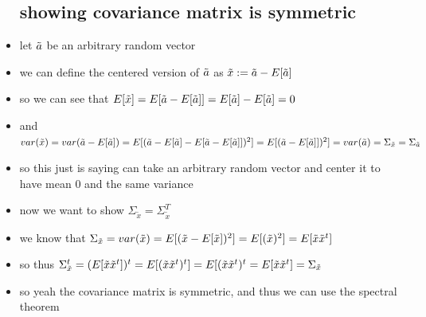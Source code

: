 \documentclass{article}
\begin{document}
\begin{itemize}
\subsection*{showing covariance matrix is symmetric}
\item let $\Tilde{a}$ be an arbitrary random vector
\item we can define  the centered version of $\Tilde{a}$ as $\Tilde{x}:=\Tilde{a}-E[\Tilde{a}]$ 
\item so we can see that $E[\Tilde{x}]=E[\Tilde{a}-E[\Tilde{a}]]=E[\Tilde{a}]-E[\Tilde{a}]=0$
\item and $var(\Tilde{x})=var(\Tilde{a}-E[\Tilde{a}])=E[(\Tilde{a}-E[\Tilde{a}] - E[\Tilde{a}-E[\Tilde{a}]])^2]=E[(\Tilde{a}-E[\Tilde{a}]])^2]=var(\Tilde{a})=\Sigma_{\Tilde{x}}=\Sigma_{\tilde{a}}$
\item so this just is saying can take an arbitrary random vector and center it to have mean 0 and the same variance
\item now we want to show $\Sigma_{\tilde{x}}=\Sigma_{\tilde{x}}^{T}$
\item we know that $\Sigma_{\Tilde{x}}=var(\Tilde{x})=E[(\Tilde{x}-E[\Tilde{x}])^2]=E[(\Tilde{x})^2]=E[\Tilde{x}\Tilde{x}^{t}]$
\item so thus $\Sigma_{\Tilde{x}}^{t}=(E[\Tilde{x}\Tilde{x}^{t}])^{t}=E[(\Tilde{x}\Tilde{x}^{t})^{t}]=E[(\Tilde{x}\Tilde{x}^{t})^{t}=E[\Tilde{x}\Tilde{x}^{t}]=\Sigma_{\Tilde{x}}$
\item so yeah the covariance matrix is symmetric, and thus we can use the spectral theorem

\end{itemize}
\end{document}
